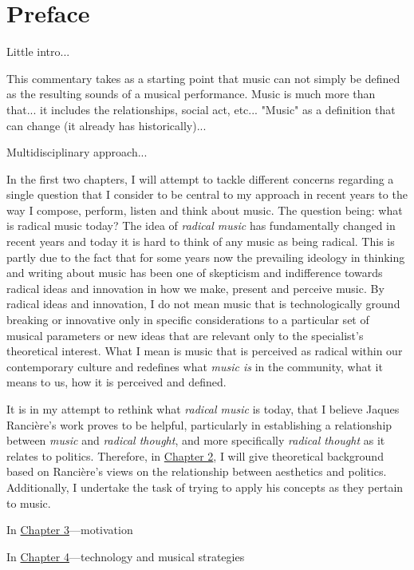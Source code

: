 \chapter{Preface}


Little intro... 

This commentary takes as a starting point that music can not simply be defined as the resulting sounds of a musical performance. Music is much more than that... it includes the relationships, social act, etc... "Music" as a definition that can change (it already has historically)...

Multidisciplinary approach...

In the first two chapters, I will attempt to tackle different concerns regarding a single question that I consider to be central to my approach in recent years to the way I compose, perform, listen and think about music. The question being: what is radical music today? The idea of \emph{radical music} has fundamentally changed in recent years and today it is hard to think of any music as being radical. This is partly due to the fact that for some years now the prevailing ideology in thinking and writing about music has been one of skepticism and indifference towards radical ideas and innovation in how we make, present and perceive music. By radical ideas and innovation, I do not mean music that is technologically ground breaking or innovative only in specific considerations to a particular set of musical parameters or new ideas that are relevant only to the specialist's theoretical interest. What I mean is music that is perceived as radical within our contemporary culture and redefines what \emph{music is} in the community, what it means to us, how it is perceived and defined.

It is in my attempt to rethink what \emph{radical music} is today, that I believe Jaques Ranci\`{e}re's work proves to be helpful, particularly in establishing a relationship between \emph{music} and \emph{radical thought}, and more specifically \emph{radical thought} as it relates to politics. Therefore, in \hyperlink{chapter2}{Chapter 2}, I will give theoretical background based on Ranci\`{e}re's views on the relationship between aesthetics and politics. Additionally, I undertake the task of trying to apply his concepts as they pertain to music. 

In \hyperlink{chapter3}{Chapter 3}---motivation

In \hyperlink{chapter4}{Chapter 4}---technology and musical strategies 

